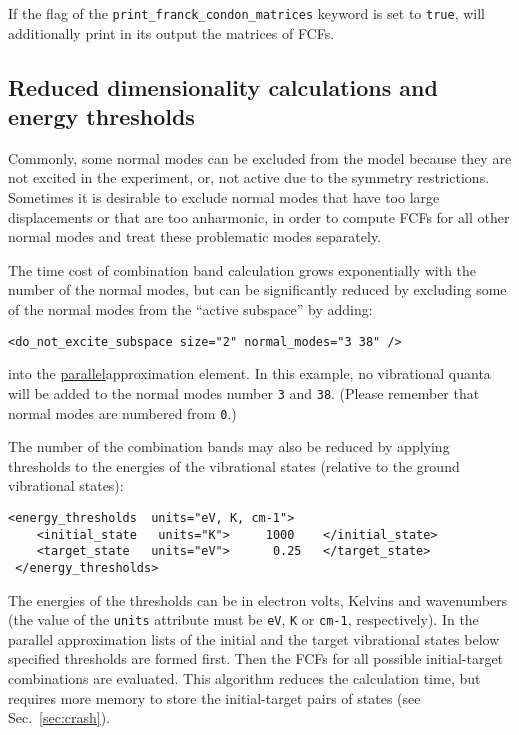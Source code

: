 \documentclass[11pt]{article}
\begin{document}
If the flag of the \texttt{print\_franck\_condon\_matrices} keyword is set to 
\texttt{true}, \ezFCF{} will additionally print in its output the matrices of 
FCFs.

\subsection{Reduced dimensionality calculations and energy thresholds}
\label{sec:para:subspace}

Commonly, some normal modes can be excluded from the model because they are not excited in the experiment,
or, not active due to the symmetry restrictions. Sometimes it is desirable to exclude normal modes that have too large displacements or that are too anharmonic,
in order to compute FCFs for all other normal modes and treat these problematic modes separately.


The time cost of combination band calculation grows exponentially with the number of the normal modes, 
but can be significantly reduced by excluding some of the normal modes from the ``active subspace'' 
by adding:
\begin{lstlisting}[frame=single,framerule=0pt]
   <do_not_excite_subspace size="2" normal_modes="3 38" />
\end{lstlisting}
into the \ul{parallel}{approximation} element. In this example, no vibrational quanta will be added to 
the normal modes number {\tt 3} and {\tt 38}. (Please remember that normal modes are numbered from {\tt 0}.)

The number of the combination bands  may also be reduced by applying 
thresholds to the energies of the vibrational states 
(relative to the ground vibrational states):
\begin{lstlisting}[frame=single,framerule=0pt]
 <energy_thresholds  units="eV, K, cm-1">
    <initial_state   units="K">     1000    </initial_state>
    <target_state   units="eV">      0.25   </target_state>
 </energy_thresholds>
\end{lstlisting}
The energies of the thresholds can be in electron volts, Kelvins and wavenumbers 
(the value of the {\tt units} attribute must be {\tt eV}, {\tt K} or {\tt cm-1}, respectively).
In the parallel approximation lists of the initial and the target vibrational states below 
specified thresholds are formed first. 
Then the FCFs for all possible initial-target combinations are evaluated.
This algorithm reduces the calculation time, but requires more memory to store
the initial-target pairs of states (see Sec.~\ref{sec:crash}).
\end{document}
